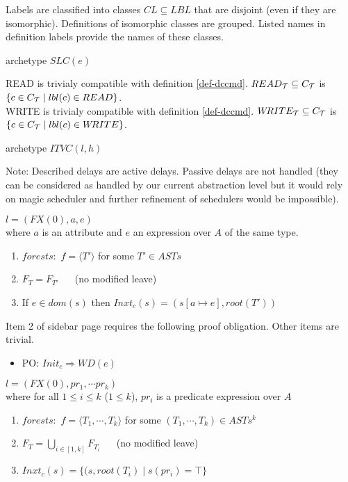 \documentclass{article}
\begin{document}
Labels are classified into classes $CL\subseteq LBL$ that are disjoint (even if they are isomorphic).  Definitions of isomorphic classes are grouped. Listed names in definition labels provide the names of these classes.
\begin{definition} archetype $SLC(e)$
\end{definition}
READ is trivialy compatible with definition \ref{def-dccmd}. 
$READ_{\cal T}\subseteq C_{\cal T}$ is $\{c\in C_{\cal T}\mid lbl(c)\in READ\}$.\\
W\!RITE is trivialy compatible with definition \ref{def-dccmd}. 
$W\!RITE_{\cal T}\subseteq C_{\cal T}$ is $\{c\in C_{\cal T}\mid lbl(c)\in W\!RITE\}$.
\begin{definition} archetype $ITVC(l,h)$
\end{definition}
Note: Described delays are active delays. Passive delays are not handled (they can be considered as handled by our current abstraction level but it would rely on magic scheduler and further refinement of schedulers would be impossible).
\begin{definition}[ACTION] $l=(FX(0),a,e)$\\ where $a$ is an attribute and $e$ an expression over $A$ of the same type.
\begin{enumerate} 
\item $forests:$  $f=\langle T'\rangle$ for some $T'\in ASTs$
\item $F_T=F_{T'}~~~~~~$ {\small (no modified leave)}\setcounter{enumi}{3} 
\item If $e\in dom(s)$ then $Inxt_c(s)=(s[a\mapsto e],root(T'))$
\end{enumerate}
\end{definition}
Item 2 of sidebar page \pageref{safestates} requires the following proof obligation. Other items are trivial.
\begin{itemize}
\item PO: $Init_c\Rightarrow W\!D(e)$
\end{itemize}
\begin{definition}[CHOICE] $l=(FX(0),pr_1,\cdots pr_k)$\\ where for all $1\leq i\leq k$ ($1\leq k$), $pr_i$ is a predicate expression over $A$
\begin{enumerate} 
\item $forests:$  $f=\langle T_1,\cdots,T_k\rangle$ for some $(T_1,\cdots,T_k)\in AST\!s^k$
\item $F_T=\bigcup_{i\in[1,k]}F_{T_i}~~~~~~$ {\small (no modified leave)}\setcounter{enumi}{3} 
\item $Inxt_c(s)=\{(s,root(T_i)\mid s(pr_i)=\top\}$
\end{enumerate}
\end{definition}
\end{document}
